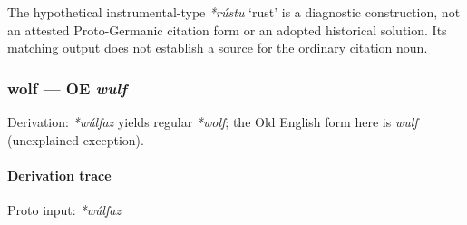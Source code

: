\documentclass[
  british,
  a4paper,
]{article}
\providecommand{\Recon}[1]{\emph{*#1}}
\begin{document}
The hypothetical instrumental-type \Recon{rústu} `rust' is a diagnostic
construction, not an attested Proto-Germanic citation form or an adopted
historical solution. Its matching output does not establish a source for
the ordinary citation noun.

\subsubsection{\texorpdfstring{wolf --- OE
\emph{wulf}}{wolf --- OE wulf}}\label{wolf-oe-wulf}

Derivation: \emph{*wúlfaz} yields regular \Recon{wolf}; the Old English
form here is \emph{wulf} (unexplained exception).

\paragraph{Derivation trace}\label{derivation-trace-185}

Proto input: \emph{*wúlfaz}

\begingroup
\setlength{\fboxsep}{6pt}
\end{document}
